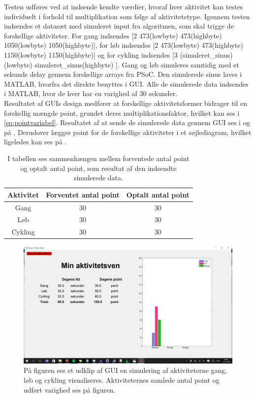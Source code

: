 Testen udføres ved at indsende kendte værdier, hvoraf hver aktivitet kan testes individuelt i forhold til multiplikation som følge af aktivitetstype.
Igennem testen indsendes et datasæt med simuleret input fra algoritmen, som skal trigge de forskellige aktiviteter. For gang indsendes [2 473(lowbyte) 473(highbyte) 1050(lowbyte) 1050(highbyte)], for løb indsendes [2 473(lowbyte) 473(highbyte) 1150(lowbyte) 1150(highbyte)] og for cykling indsendes [3 (simuleret_sinus)(lowbyte) simuleret_sinus(highbyte) ]. Gang og løb simuleres samtidig med et sekunds delay gennem forskellige arrays fra PSoC. Den simulerede sinus laves i MATLAB, hvorfra det direkte benyttes i GUI. Alle de simulerede data indsendes i MATLAB, hvor de hver har en varighed af 30 sekunder. \\
Resultatet af GUIs design medfører at forskellige aktivitetsformer bidrager til en forskellig mængde point, grundet deres multiplikationsfaktor, hvilket kan ses i \eqref{eq:pointvariabel}. Resultatet af at sende de simulerede data gennem GUI ses i  og på . Derudover lægges point for de forskellige aktiviteter i et søjlediagram, hvilket ligeledes kan ses på .
\begin{table}[H]
	\centering
	\begin{tabular}{ccc}
		\hline
		\rowcolor[HTML]{C0C0C0} 
		Aktivitet 	& Forventet antal point & Optalt antal point \\ \hline
		Gang 	&  30 & 30  \\ \hline
		Løb 	& 30 & 30 \\ \hline
		Cykling & 30 & 30 \\ \hline
	\end{tabular}
	\caption{I tabellen ses sammenhængen mellem forventede antal point og optalt antal point, som resultat af den indsendte simulerede data.}
	\label{test:GUI}
\end{table}\vspace{-.5cm}

\begin{figure}[H]
	\centering
	\includegraphics[scale=0.7]{figures/cDesign/test_GUI.png}
	\caption{På figuren ses et udklip af GUI en simulering af aktiviteterne gang, løb og cykling visualiseres. Aktiviteternes samlede antal point og udført varighed ses på figuren.}
	\label{fig:GUI2}
\end{figure}


